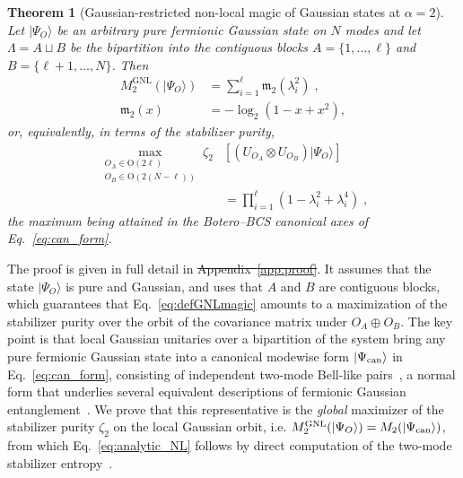\documentclass[aps,prl,twocolumn,superscriptaddress,reprint,longbibliography,nofootinbib]{revtex4-2}
\renewcommand{\log}{\operatorname{log}}\renewcommand{\det}{\operatorname{det}}
\newtheorem{theorem}{Theorem}
\newcommand{\RENYI}{\alpha}
\providecommand{\DIFaddtex}[1]{{\protect\color{blue}\uwave{#1}}} %
\providecommand{\DIFdeltex}[1]{{\protect\color{red}\sout{#1}}}                      %
\providecommand{\DIFaddbegin}{} %
\providecommand{\DIFaddend}{} %
\providecommand{\DIFdelbegin}{} %
\providecommand{\DIFdelend}{} %
\providecommand{\DIFadd}[1]{\texorpdfstring{\DIFaddtex{#1}}{#1}} %
\providecommand{\DIFdel}[1]{\texorpdfstring{\DIFdeltex{#1}}{}} %
\newcommand{\DIFscaledelfig}{0.5}
\newlength{\DIFdelgraphicswidth} %
\newlength{\DIFdelgraphicsheight} %
\newcommand{\DIFaddincludegraphics}[2][]{{\color{blue}\fbox{\DIFOincludegraphics[#1]{#2}}}} %
\newcommand{\DIFdelincludegraphics}[2][]{%
\sbox{\DIFdelgraphicsbox}{\DIFOincludegraphics[#1]{#2}}%
\settoboxwidth{\DIFdelgraphicswidth}{\DIFdelgraphicsbox} %
\settoboxtotalheight{\DIFdelgraphicsheight}{\DIFdelgraphicsbox} %
\scalebox{\DIFscaledelfig}{%
\parbox[b]{\DIFdelgraphicswidth}{\usebox{\DIFdelgraphicsbox}\\[-\baselineskip] \rule{\DIFdelgraphicswidth}{0em}}\llap{\resizebox{\DIFdelgraphicswidth}{\DIFdelgraphicsheight}{%
\setlength{\unitlength}{\DIFdelgraphicswidth}%
\begin{picture}(1,1)%
\thicklines\linethickness{2pt} %
{\color[rgb]{1,0,0}\put(0,0){\framebox(1,1){}}}%
{\color[rgb]{1,0,0}\put(0,0){\line( 1,1){1}}}%
{\color[rgb]{1,0,0}\put(0,1){\line(1,-1){1}}}%
\end{picture}%
}\hspace*{3pt}}} %
} %
\DeclareRobustCommand{\DIFaddbegin}{\DIFOaddbegin \let\includegraphics\DIFaddincludegraphics} %
\DeclareRobustCommand{\DIFaddend}{\DIFOaddend \let\includegraphics\DIFOincludegraphics} %
\DeclareRobustCommand{\DIFdelbegin}{\DIFOdelbegin \let\includegraphics\DIFdelincludegraphics} %
\DeclareRobustCommand{\DIFdelend}{\DIFOaddend \let\includegraphics\DIFOincludegraphics} %
\begin{document}
\begin{theorem}[Gaussian-restricted non-local magic of Gaussian states at $\RENYI=2$]
\label{thm:global}
Let $|\Psi_O\rangle$ be an arbitrary pure fermionic Gaussian state on $N$ modes and let $\Lambda=A\sqcup B$ be the bipartition into the contiguous blocks $A=\{1,\dots,\ell\}$ and $B=\{\ell+1,\dots,N\}$. Then
\begin{equation}
\begin{split}
    M_{2}^{\mathrm{GNL}}(|\Psi_O\rangle)&=\sum_{i=1}^{\ell}\mathfrak{m}_2(\lambda_i^2)\;,\\
    \mathfrak{m}_2(x)&=-\log_2\!\left(1-x+x^2\right),
\end{split}
    \label{eq:analytic_NL}
\end{equation}
or, equivalently, in terms of the stabilizer purity,
\begin{equation}
\begin{split}
\max_{\substack{O_A\in \mathrm{O}(2\ell)\\ O_B\in \mathrm{O}(2(N-\ell))}}\!\!\!\!\zeta_2&\left[(U_{O_A}\otimes U_{O_B})|\Psi_O\rangle\right]\\ &=\prod_{i=1}^{\ell}\left(1-\lambda_i^2+\lambda_i^4\right)\;,
\end{split}
\label{eq:thm_zeta}
\end{equation}
the maximum being attained in the Botero--BCS canonical axes of Eq.~\eqref{eq:can_form}.
\end{theorem}

The proof is given in full detail in \DIFdelbegin \DIFdel{Appendix~\ref{app:proof}}\DIFdelend \DIFaddbegin \DIFadd{SM, Sec.~S1}\DIFaddend . It assumes that the state $|\Psi_O\rangle$ is pure and Gaussian, and uses that $A$ and $B$ are contiguous blocks, which guarantees that Eq.~\eqref{eq:defGNLmagic} amounts to a maximization of the stabilizer purity over the orbit of the covariance matrix under $O_A\oplus O_B$.
The key point is that local Gaussian unitaries over a bipartition of the system bring any pure fermionic Gaussian state into a canonical modewise form $\ket{\Psi_{\rm can}}$ in Eq.~\eqref{eq:can_form}, consisting of independent two-mode Bell-like pairs~\cite{BoteroReznik2004}, a normal form that underlies several equivalent descriptions of fermionic Gaussian entanglement~\cite{SpeeSchwaigerGiedkeKraus2018,MorralYepesLangerGammonSmithKrausPollmann2025,langer2026matchgatecircuitrepresentationfermionic}.
We prove that this representative is the \emph{global} maximizer of the stabilizer purity $\zeta_2$ on the local Gaussian orbit, i.e.
$M_{2}^{\mathrm{GNL}}(|\Psi_O\rangle) = M_{2}(|\Psi_{\rm can}\rangle)$,
from which Eq.~\eqref{eq:analytic_NL} follows by direct computation of the two-mode stabilizer entropy~\cite{Cao_2025,qian2025quantumnonlocalnonstabilizerness}.
\end{document}

